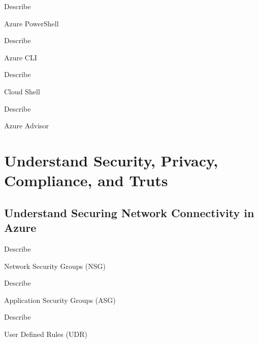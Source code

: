 \documentclass{scrartcl}
\newenvironment{flashcard}[2][]{%
    #1
    \vfill
    \centerline{\Large{#2}}
    \vfill
    \newpage
}
{\newpage}
\newcommand{\sectioncard}[1]{
    \vspace*{\stretch{1}}
    \section{#1}
    \vspace*{\stretch{1}}
    \pagebreak
}
\newcommand{\subsectioncard}[1]{
    \vspace*{\stretch{1}}
    \subsection{#1}
    \vspace*{\stretch{1}}
    \pagebreak
}
\begin{document}
    \begin{flashcard}[Describe]{Azure PowerShell}

    \end{flashcard}

    \begin{flashcard}[Describe]{Azure CLI}

    \end{flashcard}

    \begin{flashcard}[Describe]{Cloud Shell}

    \end{flashcard}

    \begin{flashcard}[Describe]{Azure Advisor}

    \end{flashcard}

    \sectioncard{Understand Security, Privacy, Compliance, and Truts}

    \subsectioncard{Understand Securing Network Connectivity in Azure}

    \begin{flashcard}[Describe]{Network Security Groups (NSG)}

    \end{flashcard}

    \begin{flashcard}[Describe]{Application Security Groups (ASG)}

    \end{flashcard}

    \begin{flashcard}[Describe]{User Defined Rules (UDR)}

    \end{flashcard}
\end{document}
